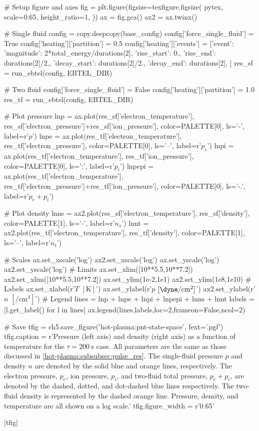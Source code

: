 \begin{pycode}[chapter5]
# Setup figure and axes
fig = plt.figure(figsize=texfigure.figsize(
    pytex,
    scale=0.65,
    height_ratio=1,
))
ax = fig.gca()
ax2 = ax.twinx()

# Single fluid
config = copy.deepcopy(base_config)
config['force_single_fluid'] = True
config['heating']['partition'] = 0.5
config['heating']['events'] = [{'event': {
    'magnitude': 2*total_energy/durations[2],
    'rise_start': 0.,
    'rise_end': durations[2]/2.,
    'decay_start': durations[2]/2.,
    'decay_end': durations[2],
}}]
res_sf = run_ebtel(config, EBTEL_DIR)

# Two fluid
config['force_single_fluid'] = False
config['heating']['partition'] = 1.0
res_tf = run_ebtel(config, EBTEL_DIR)

# Plot pressure
lnp = ax.plot(res_sf['electron_temperature'], res_sf['electron_pressure']+res_sf['ion_pressure'], 
              color=PALETTE[0], ls='-', label=r'$p$')
lnpe = ax.plot(res_tf['electron_temperature'], res_tf['electron_pressure'],
               color=PALETTE[0], ls='--', label=r'$p_e$')
lnpi = ax.plot(res_tf['electron_temperature'], res_tf['ion_pressure'],
               color=PALETTE[0], ls=':', label=r'$p_i$')
lnpepi = ax.plot(res_tf['electron_temperature'], res_tf['electron_pressure']+res_tf['ion_pressure'], 
                 color=PALETTE[0], ls='-.', label=r'$p_e+p_i$')

# Plot density
lnns = ax2.plot(res_sf['electron_temperature'], res_sf['density'],
                color=PALETTE[1], ls='-', label=r'$n_s$')
lnnt = ax2.plot(res_tf['electron_temperature'], res_tf['density'],
                color=PALETTE[1], ls='--', label=r'$n_t$')

# Scales
ax.set_xscale('log')
ax2.set_xscale('log')
ax.set_yscale('log')
ax2.set_yscale('log')
# Limits
ax.set_xlim([10**5.5,10**7.2])
ax2.set_xlim([10**5.5,10**7.2])
ax.set_ylim(1e-2,1e1)
ax2.set_ylim(1e8,1e10)
# Labels
ax.set_xlabel(r'$T$ $[\si{\kelvin}]$')
ax.set_ylabel(r'$p$ $[\si{\dyne\per\square\cm}]$')
ax2.set_ylabel(r'$n$ $[\si{\per\cubic\cm}]$')
# Legend
lines = lnp + lnpe + lnpi + lnpepi + lnns + lnnt
labels = [l.get_label() for l in lines]
ax.legend(lines,labels,loc=2,frameon=False,ncol=2)

# Save
tfig = ch5.save_figure('hot-plasma:pnt-state-space', fext='.pgf')
tfig.caption = r'Pressure (left axis) and density (right axis) as a function of temperature for the $\tau=\SI{200}{\second}$ case. All parameters are the same as those discussed in \autoref{hot-plasma:subsubsec:pulse_res}. The single-fluid pressure $p$ and density $n$ are denoted by the solid blue and orange lines, respectively. The electron pressure, $p_e$, ion pressure, $p_i$, and two-fluid total pressure, $p_e+p_i$, are denoted by the dashed, dotted, and dot-dashed blue lines respectively. The two-fluid density is represented by the dashed orange line. Pressure, density, and temperature are all shown on a log scale.'
tfig.figure_width = r'0.65\textwidth'
\end{pycode}
\py[chapter5]|tfig|

